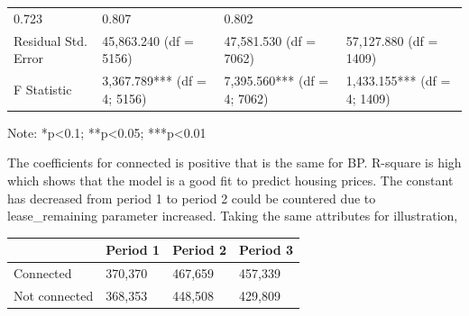 \documentclass[]{book}
\begin{document}
\begin{longtable}[]{@{}llll@{}}
\begin{minipage}[t]{0.24\columnwidth}
0.723\strut
\end{minipage} & \begin{minipage}[t]{0.24\columnwidth}\raggedright\strut
0.807\strut
\end{minipage} & \begin{minipage}[t]{0.24\columnwidth}\raggedright\strut
0.802\strut
\end{minipage}\tabularnewline
\begin{minipage}[t]{0.17\columnwidth}\raggedright\strut
Residual Std. Error\strut
\end{minipage} & \begin{minipage}[t]{0.24\columnwidth}\raggedright\strut
45,863.240 (df = 5156)\strut
\end{minipage} & \begin{minipage}[t]{0.24\columnwidth}\raggedright\strut
47,581.530 (df = 7062)\strut
\end{minipage} & \begin{minipage}[t]{0.24\columnwidth}\raggedright\strut
57,127.880 (df = 1409)\strut
\end{minipage}\tabularnewline
\begin{minipage}[t]{0.17\columnwidth}\raggedright\strut
F Statistic\strut
\end{minipage} & \begin{minipage}[t]{0.24\columnwidth}\raggedright\strut
3,367.789*** (df = 4; 5156)\strut
\end{minipage} & \begin{minipage}[t]{0.24\columnwidth}\raggedright\strut
7,395.560*** (df = 4; 7062)\strut
\end{minipage} & \begin{minipage}[t]{0.24\columnwidth}\raggedright\strut
1,433.155*** (df = 4; 1409)\strut
\end{minipage}\tabularnewline
\bottomrule
\end{longtable}

Note: *p\textless{}0.1; **p\textless{}0.05; ***p\textless{}0.01

The coefficients for connected is positive that is the same for BP.
R-square is high which shows that the model is a good fit to predict
housing prices. The constant has decreased from period 1 to period 2
could be countered due to lease\_remaining parameter increased. Taking
the same attributes for illustration,

\begin{longtable}[]{@{}llll@{}}
\toprule
& Period 1 & Period 2 & Period 3\tabularnewline
\midrule
\endhead
Connected & 370,370 & 467,659 & 457,339\tabularnewline
Not connected & 368,353 & 448,508 & 429,809\tabularnewline
\bottomrule
\end{longtable}
\end{document}
